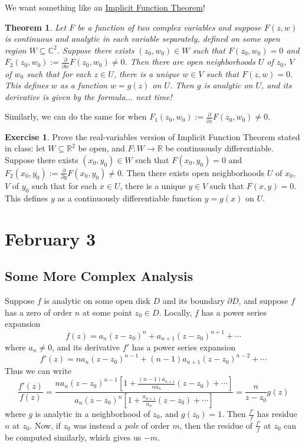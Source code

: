 \documentclass[12pt]{article}
\newcommand{\cx}{\mathbb{C}}
\newcommand{\real}{\mathbb{R}}
\newcommand{\ita}[1]{\textit{#1}}
\newtheorem{theorem}{Theorem}[section]
\theoremstyle{definition}
\newtheorem{exercise}{Exercise}
\theoremstyle{remark}
\begin{document}
We want something like an \underline{Implicit Function Theorem}!
\begin{theorem}
    Let $F$ be a function of two complex variables and suppose $F(z,w)$ is continuous and analytic in each variable separately, defined on some open region $W\subseteq\cx^2$. Suppose there exists $(z_0,w_0)\in W$ such that $F(z_0,w_0)=0$ and $F_2(z_0,w_0):=\frac{\partial}{\partial w}F(z_0,w_0)\neq0$. Then there are open neighborhoods $U$ of $z_0$, $V$ of $w_0$ such that for each $z\in U$, there is a unique $w\in V$ such that $F(z,w)=0$. This defines $w$ as a function $w=g(z)$ on $U$. Then $g$ is analytic on $U$, and its derivative is given by the formula... next time!
\end{theorem}
Similarly, we can do the same for when $F_1(z_0,w_0):=\frac{\partial}{\partial z}F(z_0,w_0)\neq0$. 
\begin{exercise}
    Prove the real-variables version of Implicit Function Theorem stated in class: let $W\subseteq\real^2$ be open, and $F:W\to\real$ be continuously differentiable. Suppose there exists $(x_0,y_0)\in W$ such that $F(x_0,y_0)=0$ and $F_2(x_0,y_0):=\frac{\partial}{\partial y}F(x_0,y_0)\neq0$. Then there exists open neighborhoods $U$ of $x_0$, $V$ of $y_0$ such that for each $x\in U$, there is a unique $y\in V$ such that $F(x,y)=0$. This defines $y$ as a continuously differentiable function $y=g(x)$ on $U$.
\end{exercise}
\section{February 3}
\subsection{Some More Complex Analysis}
Suppose $f$ is analytic on some open disk $D$ and its boundary $\partial D$, and suppose $f$ has a zero of order $n$ at some point $z_0\in D$. Locally, $f$ has a power series expansion
\begin{equation}
    f(z)=a_n(z-z_0)^n+a_{n+1}(z-z_0)^{n+1}+\dotsb
\end{equation}
where $a_n\neq0$, and its derivative $f'$ has a power series expansion
\begin{equation}
    f'(z)=na_n(z-z_0)^{n-1}+(n-1)a_{n+1}(z-z_0)^{n-2}+\dotsb
\end{equation}
Thus we can write
\begin{equation}
    \frac{f'(z)}{f(z)}=\frac{na_n(z-z_0)^{n-1}\left[1+\frac{(n-1)a_{n+1}}{na_n}(z-z_0)+\dotsb\right]}{a_n(z-z_0)^n\left[1+\frac{a_{n+1}}{a_n}(z-z_0)+\dotsb\right]}=\frac{n}{z-z_0}g(z)
\end{equation}
where $g$ is analytic in a neighborhood of $z_0$, and $g(z_0)=1$. Then $\frac{f'}{f}$ has residue $n$ at $z_0$. Now, if $z_0$ was instead a \ita{pole} of order $m$, then the residue of $\frac{f'}{f}$ at $z_0$ can be computed similarly, which gives us $-m$.
\end{document}
